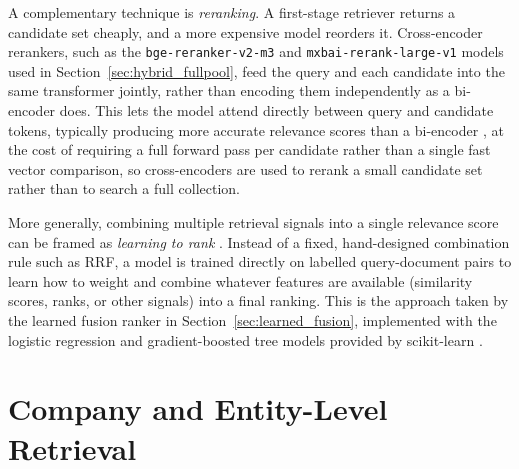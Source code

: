 \documentclass[a4paper,oneside,bibliography=totoc]{scrbook}
\begin{document}
A complementary technique is \emph{reranking}. A first-stage retriever returns a candidate set cheaply, and a more expensive model reorders it. Cross-encoder rerankers, such as the \texttt{bge-reranker-v2-m3} \citep{baaireranker2024} and \texttt{mxbai-rerank-large-v1} \citep{mixedbread2024mxbai} models used in Section~\ref{sec:hybrid_fullpool}, feed the query and each candidate into the same transformer jointly, rather than encoding them independently as a bi-encoder does. This lets the model attend directly between query and candidate tokens, typically producing more accurate relevance scores than a bi-encoder \citep{nogueira2019passage}, at the cost of requiring a full forward pass per candidate rather than a single fast vector comparison, so cross-encoders are used to rerank a small candidate set rather than to search a full collection.

More generally, combining multiple retrieval signals into a single relevance score can be framed as \emph{learning to rank} \citep{liu2009learning}. Instead of a fixed, hand-designed combination rule such as RRF, a model is trained directly on labelled query-document pairs to learn how to weight and combine whatever features are available (similarity scores, ranks, or other signals) into a final ranking. This is the approach taken by the learned fusion ranker in Section~\ref{sec:learned_fusion}, implemented with the logistic regression and gradient-boosted tree models provided by scikit-learn \citep{pedregosa2011scikit}.

\section{Company and Entity-Level Retrieval}
\label{sec:lit_entity}
\end{document}
